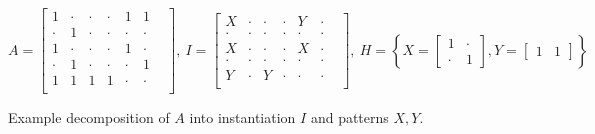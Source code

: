 
\small
$$
A =
\begin{bmatrix}
1 & \cdot & \cdot & \cdot & 1 & 1 &  \\[-.2em]
\cdot & 1 & \cdot & \cdot & \cdot & \cdot &  \\[-.2em]
1 & \cdot & \cdot & \cdot & 1 & \cdot &  \\[-.2em]
\cdot & 1 & \cdot & \cdot & \cdot & 1 &  \\[-.2em]
1 & 1 & 1 & 1 & \cdot & \cdot &  \\
\end{bmatrix}\!\!, \
I = 
\begin{bmatrix}
X & \cdot & \cdot & \cdot & Y & \cdot & \\[-.2em]
\cdot & \cdot & \cdot & \cdot & \cdot & \cdot &  \\[-.2em]
X & \cdot & \cdot & \cdot & X & \cdot &  \\[-.2em]
\cdot & \cdot & \cdot & \cdot & \cdot & \cdot &  \\[-.2em]
Y & \cdot & Y & \cdot & \cdot & \cdot &  \\[-.2em]
\end{bmatrix}\!\!, \
H = \left\{
X =
\begin{bmatrix}
1 & \cdot \\[-.2em]
\cdot & 1
\end{bmatrix}\!\!,
Y =
\begin{bmatrix}
1 & 1
\end{bmatrix}\right\}
$$
\caption{Example decomposition of $A$ into instantiation $I$ and patterns $X,Y$.}
